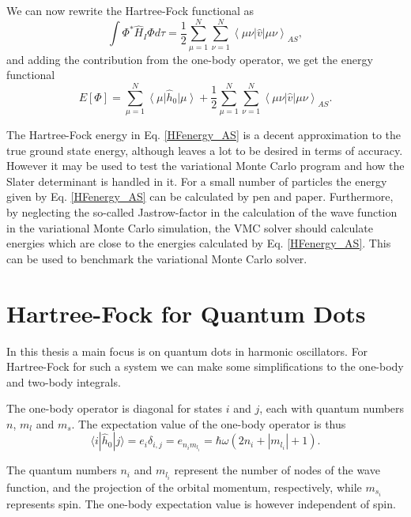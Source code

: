 	We can now rewrite the Hartree-Fock functional as
	\[
	\int\Phi^{*}\hat{H}_{I}\Phi d\tau=\frac{1}{2}\sum_{\mu=1}^{N}\sum_{\nu=1}^{N}\left\langle \mu\nu\right|\hat{v}\left|\mu\nu\right\rangle _{AS},
	\]
	and adding the contribution from the one-body operator, we get the energy functional
	\begin{equation} \label{HFenergy_AS}
	E\left[\Phi\right]=\sum_{\mu=1}^{N}\left\langle \mu\right|\hat{h}_{0}\left|\mu\right\rangle +\frac{1}{2}\sum_{\mu=1}^{N}\sum_{\nu=1}^{N}\left\langle \mu\nu\right|\hat{v}\left|\mu\nu\right\rangle _{AS}.
	\end{equation}


	The Hartree-Fock energy in Eq. \eqref{HFenergy_AS} is a decent approximation to the true ground state energy, although leaves a lot to be desired in terms of accuracy. However it may be used to test the variational Monte Carlo program and how the Slater determinant is handled in it. For a small number of particles the energy given by Eq. \eqref{HFenergy_AS} can be calculated by pen and paper. Furthermore, by neglecting the so-called Jastrow-factor in the calculation of the wave function in the variational Monte Carlo simulation, the VMC solver should calculate energies which are close to the energies calculated by Eq. \eqref{HFenergy_AS}. This can be used to benchmark the variational Monte Carlo solver.

\section{Hartree-Fock for Quantum Dots}
	In this thesis a main focus is on quantum dots in harmonic oscillators. For Hartree-Fock for such a system we can make some simplifications to the one-body and two-body integrals. 

	The one-body operator is diagonal for states $i$ and $j$, each with quantum numbers $n$, $m_{l}$ and $m_{s}$. The expectation value of the one-body operator is thus
	\[
	\langle i|\hat{h}_{0}|j\rangle=e_{i}\delta_{i,j}=e_{n_{i}m_{l_{i}}}=\hbar\omega(2n_{i}+|m_{l_{i}}|+1).
	\]

	The quantum numbers $n_{i}$ and $m_{l_{i}}$ represent the number of nodes of the wave function, and the projection of the orbital momentum, respectively, while $m_{s_{i}}$ represents spin. The one-body expectation value is however independent of spin.

